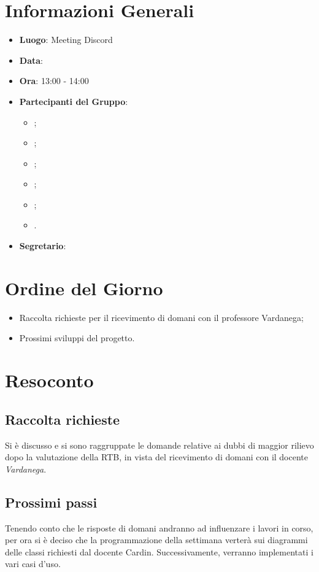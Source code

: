 \section{Informazioni Generali}

\begin{itemize}
\item{\textbf{Luogo}}: Meeting Discord
\item{\textbf{Data}}: \D
\item{\textbf{Ora}}: 13:00 - 14:00
\item{\textbf{Partecipanti del Gruppo}}: 
	\begin{itemize}
	\item{\EP{};} 
	\item{\FP{};}
	\item{\GC{};}
	\item{\LW{};}
	\item{\MG{};}
	\item{\PV{}.}
	\end{itemize} 
\item{\textbf{Segretario}}: \PV{}	
\end{itemize}

\section{Ordine del Giorno}
\begin{itemize}
\item{Raccolta richieste per il ricevimento di domani con il professore Vardanega;}
\item{Prossimi sviluppi del progetto.}
\end{itemize}

\section{Resoconto}
 
\subsection{Raccolta richieste}
Si è discusso e si sono raggruppate le domande relative ai dubbi di maggior rilievo dopo la valutazione della RTB, in vista del ricevimento di domani con il docente \textit{Vardanega}.

\subsection{Prossimi passi}
Tenendo conto che le risposte di domani andranno ad influenzare i lavori in corso, per ora si è deciso che la programmazione della settimana verterà sui diagrammi delle classi richiesti dal docente Cardin. Successivamente, verranno implementati i vari casi d'uso. 
 
